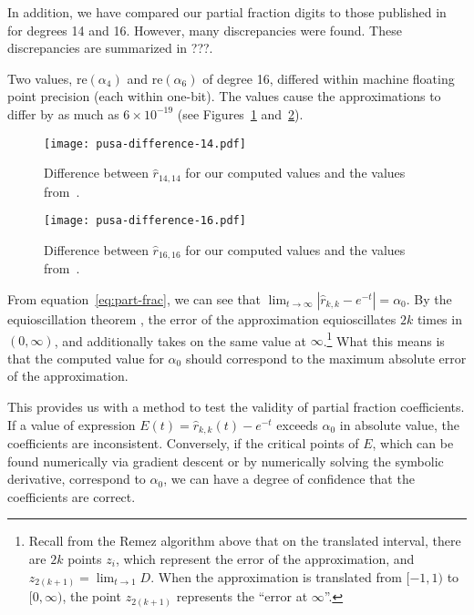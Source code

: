 
In addition, we have compared our partial fraction digits to those published
in~\cite{pusa2012correction} for degrees 14 and 16. However, many
discrepancies were found. These discrepancies are summarized in {\color{red}
  ???}.

Two values, $\mathrm{re}(\alpha_4)$ and $\mathrm{re}(\alpha_6)$ of degree 16,
differed within machine floating point precision (each within one-bit). The
values cause the approximations to differ by as much as $6\times10^{-19}$ (see
Figures~\ref{fig:pusa-difference-14} and~\ref{fig:pusa-difference-16}).

\begin{figure}[!ht]
\centering
\texttt{[image: pusa-difference-14.pdf]}
\caption{Difference between $\hat{r}_{14,14}$ for our computed values and the
  values from~.}
\label{fig:pusa-difference-14}
\end{figure}

\begin{figure}[!ht]
\centering
\texttt{[image: pusa-difference-16.pdf]}
\caption{Difference between $\hat{r}_{16,16}$ for our computed values and the
  values from~.}
\label{fig:pusa-difference-16}
\end{figure}

From equation~\ref{eq:part-frac}, we can see that
$\lim_{t\to\infty}{\left|\hat{r}_{k,k} - e^{-t}\right|} = \alpha_0$. By the
equioscillation theorem , the error of the approximation equioscillates $2k$ times
in $(0, \infty)$, and additionally takes on the same value at $\infty$.\footnote{Recall
from the Remez algorithm above that on the translated interval, there are $2k$
points $z_i$, which represent the error of the approximation, and
$z_{2(k+1)}=\lim_{t\to 1}{D}$. When the approximation is translated from $[-1,
1)$ to $[0, \infty)$, the point $z_{2(k + 1)}$ represents the ``error at
$\infty$''.} What this means is that the computed value for $\alpha_0$ should
correspond to the maximum absolute error of the approximation.

This provides us with a method to test the validity of partial fraction
coefficients. If a value of expression $E(t) = \hat{r}_{k,k}(t) - e^{-t}$
exceeds $\alpha_0$ in absolute value, the coefficients are inconsistent.
Conversely, if the critical points of $E$, which can be found numerically via
gradient descent or by numerically solving the symbolic derivative, correspond
to $\alpha_0$, we can have a degree of confidence that the coefficients are
correct.

